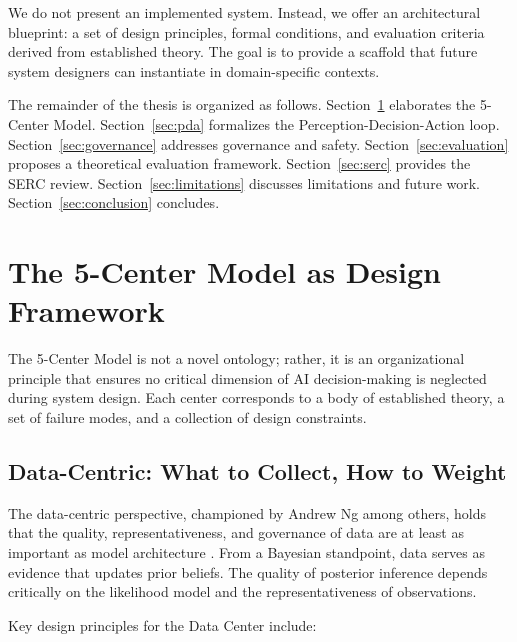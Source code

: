 \documentclass[11pt,a4paper]{article}
\begin{document}
We do not present an implemented system. Instead, we offer an architectural blueprint: a set of design principles, formal conditions, and evaluation criteria derived from established theory. The goal is to provide a scaffold that future system designers can instantiate in domain-specific contexts.

The remainder of the thesis is organized as follows. Section~\ref{sec:5center} elaborates the 5-Center Model. Section~\ref{sec:pda} formalizes the Perception-Decision-Action loop. Section~\ref{sec:governance} addresses governance and safety. Section~\ref{sec:evaluation} proposes a theoretical evaluation framework. Section~\ref{sec:serc} provides the SERC review. Section~\ref{sec:limitations} discusses limitations and future work. Section~\ref{sec:conclusion} concludes.

\section{The 5-Center Model as Design Framework}
\label{sec:5center}

The 5-Center Model is not a novel ontology; rather, it is an organizational principle that ensures no critical dimension of AI decision-making is neglected during system design. Each center corresponds to a body of established theory, a set of failure modes, and a collection of design constraints.

\subsection{Data-Centric: What to Collect, How to Weight}

The data-centric perspective, championed by Andrew Ng among others, holds that the quality, representativeness, and governance of data are at least as important as model architecture \citep{ng2021data}. From a Bayesian standpoint, data serves as evidence that updates prior beliefs. The quality of posterior inference depends critically on the likelihood model and the representativeness of observations.

Key design principles for the Data Center include:
\end{document}
